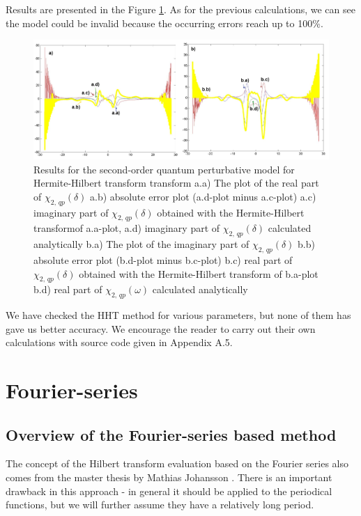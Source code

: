 \documentclass[12pt,twoside,a4paper]{article}
\numberwithin{equation}{subsection}
\numberwithin{figure}{subsection}
\begin{document}
Results are presented in the Figure \ref{fig:hht_qp2}. As for the previous calculations, we can see the model could be invalid
because the occurring errors reach up to 100\%.

\begin{figure} 
  \includegraphics[width=150mm]{img/hht_qp2.png}
  \caption{Results for the second-order quantum perturbative model for Hermite-Hilbert transform transform
     a.a) The plot of the real part of ${\chi_{2, \,qp}}(\delta )$
     a.b) absolute error plot (a.d-plot minus a.c-plot)
     a.c) imaginary part of ${\chi_{2, \,qp}}(\delta )$ obtained with the Hermite-Hilbert transformof a.a-plot, 
     a.d) imaginary part of ${\chi_{2, \,qp}}(\delta )$ calculated analytically 
     b.a) The plot of the imaginary part of ${\chi_{2, \,qp}}(\delta )$ 
     b.b) absolute error plot (b.d-plot minus b.c-plot)
     b.c) real part of ${\chi_{2, \,qp}}(\delta )$ obtained with the Hermite-Hilbert transform of b.a-plot 
     b.d) real part of $\chi_{2, \,qp} (\omega )$ calculated analytically 
     \label{fig:hht_qp2}
     }
\end{figure} 

We have checked the HHT method for various parameters, but none of them has gave us better accuracy. We
encourage the reader to carry out their own calculations with source code given in Appendix A.5.

\section{Fourier-series} \label{chap:fourier}

\subsection{Overview of the Fourier-series based method}  \label{chap:fourier_overview}

The concept of the Hilbert transform evaluation based on the Fourier series also comes from the master thesis by Mathias Johansson
\cite{johansson_hilbert}. There is an important drawback in this approach - in general it should be applied to the periodical
functions, but we will further assume they have a relatively long period. 
\end{document}
